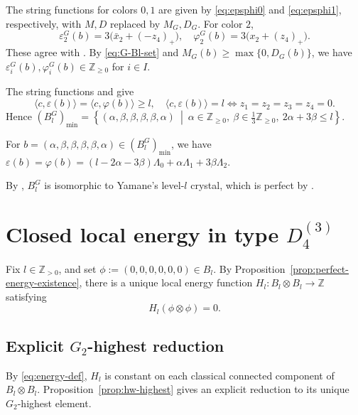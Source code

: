 \documentclass[11pt,reqno]{amsart}
\newcommand{\Z}{\mathbb Z}
\newcommand{\Zge}{\mathbb Z_{\ge 0}}
\numberwithin{table}{section}
\numberwithin{equation}{section}
\theoremstyle{plain}
\theoremstyle{definition}
\begin{document}
The string functions for colors \(0,1\) are given by
\eqref{eq:epsphi0} and \eqref{eq:epsphi1}, respectively,
with \(M,D\) replaced by \(M_G,D_G\).
For color \(2\),
\begin{equation}\label{eq:G-epsphi2}
	\varepsilon_2^G(b)
	=
	3\bigl(\bar x_2+(-z_4)_+\bigr),
	\quad
	\varphi_2^G(b)
	=
	3\bigl(x_2+(z_4)_+\bigr).
\end{equation}
These agree with
\cite[Theorem~2, equation~(3.3)]{MMO}.
By \eqref{eq:G-Bl-set} and
\(M_G(b)\ge\max\{0,D_G(b)\}\), we have
\(\varepsilon_i^G(b),\varphi_i^G(b)\in\Zge\) for \(i\in I\).

The string functions and \cite[Lemma~2]{MMO} give
\[
\langle c,\varepsilon(b)\rangle
=
\langle c,\varphi(b)\rangle
\ge l,
\quad
\langle c,\varepsilon(b)\rangle=l
\iff
z_1=z_2=z_3=z_4=0.
\]
Hence $(B_l^G)_{\min}
=
\left\{
(\alpha,\beta,\beta,\beta,\beta,\alpha)
\ \middle|\
\alpha\in\Zge,\ 
\beta\in\tfrac13\Zge,\ 
2\alpha+3\beta\le l
\right\}$.

For
\(b=(\alpha,\beta,\beta,\beta,\beta,\alpha)\in(B_l^G)_{\min}\), we have $\varepsilon(b)
=
\varphi(b)
=
(l-2\alpha-3\beta)\Lambda_0
+\alpha\Lambda_1+3\beta\Lambda_2$.


By \cite[Theorem~2]{MMO}, \(B_l^G\) is isomorphic to Yamane's
level-\(l\) crystal, which is perfect by
\cite[Theorem~2.2]{Yamane}.

\section{\texorpdfstring{Closed local energy in type $D_4^{(3)}$}
	{Closed local energy in type D4(3)}}
\label{sec:D43-closed-energy}

Fix \(l\in\Z_{>0}\), and set
\(\phi:=(0,0,0,0,0,0)\in B_l\).
By Proposition~\ref{prop:perfect-energy-existence}, there is a unique
local energy function
\(H_l:B_l\otimes B_l\longrightarrow\mathbb Z\)
satisfying
\begin{equation}\label{eq:H-normalization}
	H_l(\phi\otimes\phi)=0.
\end{equation}

\subsection{\texorpdfstring{Explicit $G_2$-highest reduction}
	{Explicit G2-highest reduction}}

By \eqref{eq:energy-def}, \(H_l\) is constant on each classical
connected component of \(B_l\otimes B_l\).
Proposition~\ref{prop:hw-highest} gives an explicit reduction to
its unique \(G_2\)-highest element.
\end{document}
